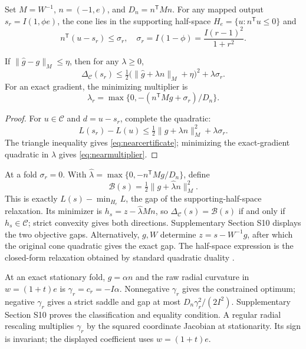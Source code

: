 Set $M=W^{-1}$, $n=(-1,e)$, and $D_n=n^{\mathsf T}Mn$. For any mapped output $s_r=I(1,\phi e)$, the cone lies in the supporting half-space $H_e=\{u:n^{\mathsf T}u\leq0\}$ and
\begin{equation}
 n^{\mathsf T}(u-s_r)\leq\sigma_r,\quad
 \sigma_r=I(1-\phi)=\frac{I(r-1)^2}{1+r^2}.
 \label{eq:supportslack}
\end{equation}
\begin{corollary}
\label{cor:gap}
If $\|\widehat g-g\|_M\leq\eta$, then for any $\lambda\geq0$,
\begin{equation}
 \Delta_{\mathcal C}(s_r)\leq
 \tfrac12\bigl(\|\widehat g+\lambda n\|_M+\eta\bigr)^2
 +\lambda\sigma_r.
 \label{eq:nearcertificate}
\end{equation}
For an exact gradient, the minimizing multiplier is
\begin{equation}
 \lambda_r=\max\{0,-(n^{\mathsf T}Mg+\sigma_r)/D_n\}.
 \label{eq:nearmultiplier}
\end{equation}
\end{corollary}
\begin{proof}
For $u\in\mathcal C$ and $d=u-s_r$, complete the quadratic:
\begin{equation*}
 L(s_r)-L(u)\leq\tfrac12\|g+\lambda n\|_M^2+\lambda\sigma_r.
\end{equation*}
The triangle inequality gives \eqref{eq:nearcertificate}; minimizing the exact-gradient quadratic in $\lambda$ gives \eqref{eq:nearmultiplier}.
\end{proof}
At a fold $\sigma_r=0$. With $\widehat\lambda=\max\{0,-n^{\mathsf T}Mg/D_n\}$, define
\begin{equation}
 \mathcal B(s)=\tfrac12\|g+\widehat\lambda n\|_M^2.
 \label{eq:residualcertificate}
\end{equation}
This is exactly $L(s)-\min_{H_e}L$, the gap of the supporting-half-space relaxation. Its minimizer is $h_s=z-\widehat\lambda Mn$, so $\Delta_{\mathcal C}(s)=\mathcal B(s)$ if and only if $h_s\in\mathcal C$; strict convexity gives both directions. Supplementary Section S10 displays the two objective gaps. Alternatively, $g,W$ determine $z=s-W^{-1}g$, after which the original cone quadratic gives the exact gap. The half-space expression is the closed-form relaxation obtained by standard quadratic duality \cite{cvxbook}.

At an exact stationary fold, $g=\alpha n$ and the raw radial curvature in $w=(1+t)e$ is $\gamma_r=c_r=-I\alpha$. Nonnegative $\gamma_r$ gives the constrained optimum; negative $\gamma_r$ gives a strict saddle and gap at most $D_n\gamma_r^2/(2I^2)$. Supplementary Section S10 proves the classification and equality condition. A regular radial rescaling multiplies $\gamma_r$ by the squared coordinate Jacobian at stationarity. Its sign is invariant; the displayed coefficient uses $w=(1+t)e$.

